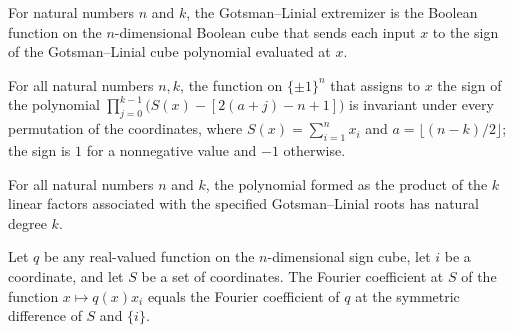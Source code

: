 \begin{definition}
\label{FABL.gotsmanLinialExtremizer}
\leanok
{}
For natural numbers $n$ and $k$, the Gotsman–Linial extremizer is the Boolean function
on the $n$-dimensional Boolean cube that sends each input $x$ to the sign of the
Gotsman–Linial cube polynomial evaluated at $x$.
\end{definition}

\begin{theorem}
\label{FABL.gotsmanLinialExtremizer_isSymmetric}
\leanok
{}
For all natural numbers $n,k$, the function on $\{\pm1\}^n$ that assigns to $x$ the sign
of the polynomial $\prod_{j=0}^{k-1}\bigl(S(x)-[2(a+j)-n+1]\bigr)$ is invariant under
every permutation of the coordinates, where $S(x)=\sum_{i=1}^n x_i$ and
$a=\lfloor(n-k)/2\rfloor$; the sign is $1$ for a nonnegative value and $-1$ otherwise.
\end{theorem}

\begin{theorem}
\label{FABL.natDegree_gotsmanLinialPolynomial}
\leanok
{}
For all natural numbers $n$ and $k$, the polynomial formed as the product of the $k$
linear factors associated with the specified Gotsman–Linial roots has natural degree
$k$.
\end{theorem}

\begin{theorem}
\label{FABL.fourierCoeff_mul_signValue}
\leanok
{}
Let $q$ be any real-valued function on the $n$-dimensional sign cube, let $i$ be a
coordinate, and let $S$ be a set of coordinates. The Fourier coefficient at $S$ of the
function $x\mapsto q(x)x_i$ equals the Fourier coefficient of $q$ at the symmetric
difference of $S$ and $\{i\}$.
\end{theorem}

